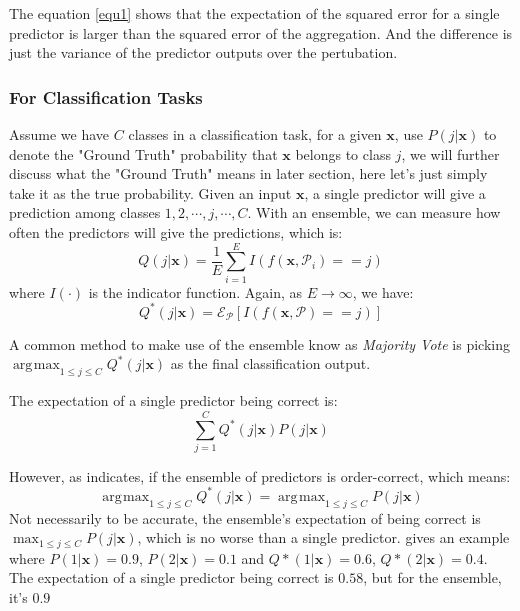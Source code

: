 \documentclass{article}
\DeclareMathOperator*{\argmax}{\arg\!\max}
\begin{document}
The equation \ref{equ1} shows that the expectation of the squared error for a single predictor is larger than the squared error of the aggregation. And the difference is just the variance of the predictor outputs over the pertubation.

\subsubsection{For Classification Tasks}
Assume we have $C$ classes in a classification task, for a given $\textbf{x}$, use $P(j|\textbf{x})$ to denote the "Ground Truth" probability that $\textbf{x}$ belongs to class $j$, we will further discuss what the "Ground Truth" means in later section, here let's just simply take it as the true probability.
Given an input $\textbf{x}$, a single predictor will give a prediction among classes ${1,2,\cdots,j,\cdots,C}$. With an ensemble, we can measure how often the predictors will give the predictions, which is:
\begin{equation}
    Q(j|\textbf{x}) = \frac{1}{E}\sum_{i=1}^{E}I(f(\textbf{x},\mathcal{P}_i)==j)
\end{equation}
where $I(\cdot)$ is the indicator function. Again, as $E\rightarrow\infty$, we have:
\begin{equation}
    Q^*(j|\textbf{x}) = \mathcal{E}_\mathcal{P}[I(f(\textbf{x},\mathcal{P})==j)]
\end{equation}

A common method to make use of the ensemble know as \textit{Majority Vote} is picking $\argmax_{1\leq j\leq C} Q^*(j|\textbf{x})$ as the final classification output. 

The expectation of a single predictor being correct is:
\begin{equation}
    \sum_{j=1}^{C}Q^*(j|\textbf{x})P(j|\textbf{x})
\end{equation}

However, as \cite{Bagging} indicates, if the ensemble of predictors is order-correct, which means:
\begin{equation}
    \argmax_{1\leq j\leq C} Q^*(j|\textbf{x}) = \argmax_{1\leq j\leq C} P(j|\textbf{x})
\end{equation}
Not necessarily to be accurate, the ensemble's expectation of being correct is $\max_{1\leq j\leq C} P(j|\textbf{x})$, which is no worse than a single predictor.  \cite{Bagging} gives an example where $P(1|\textbf{x})=0.9$, $P(2|\textbf{x})=0.1$ and $Q*(1|\textbf{x})=0.6$, $Q*(2|\textbf{x})=0.4$. The expectation of a single predictor being correct is $0.58$, but for the ensemble, it's $0.9$
\end{document}
